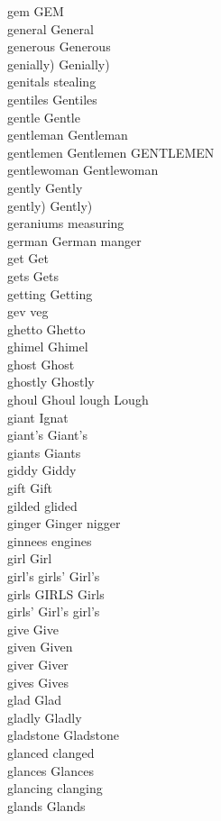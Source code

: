 gem GEM\\
general General\\
generous Generous\\
genially) Genially)\\
genitals stealing\\
gentiles Gentiles\\
gentle Gentle\\
gentleman Gentleman\\
gentlemen Gentlemen GENTLEMEN\\
gentlewoman Gentlewoman\\
gently Gently\\
gently) Gently)\\
geraniums measuring\\
german German manger\\
get Get\\
gets Gets\\
getting Getting\\
gev veg\\
ghetto Ghetto\\
ghimel Ghimel\\
ghost Ghost\\
ghostly Ghostly\\
ghoul Ghoul lough Lough\\
giant Ignat\\
giant's Giant's\\
giants Giants\\
giddy Giddy\\
gift Gift\\
gilded glided\\
ginger Ginger nigger\\
ginnees engines\\
girl Girl\\
girl's girls' Girl's\\
girls GIRLS Girls\\
girls' Girl's girl's\\
give Give\\
given Given\\
giver Giver\\
gives Gives\\
glad Glad\\
gladly Gladly\\
gladstone Gladstone\\
glanced clanged\\
glances Glances\\
glancing clanging\\
glands Glands\\
